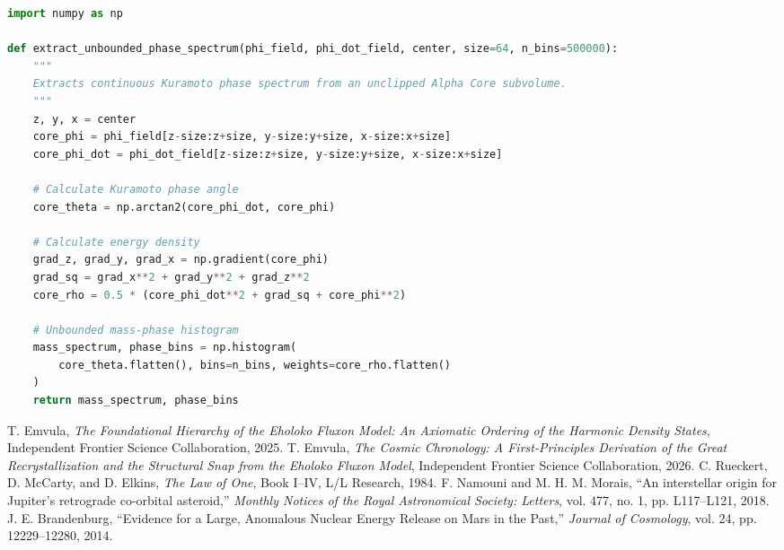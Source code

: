 \documentclass[11pt, twoside]{article}
\begin{document}
\begin{lstlisting}[language=Python, caption={Unbounded Fisher-Phase Spectroscopic Extraction Implementation.}]
import numpy as np

def extract_unbounded_phase_spectrum(phi_field, phi_dot_field, center, size=64, n_bins=500000):
    """
    Extracts continuous Kuramoto phase spectrum from an unclipped Alpha Core subvolume.
    """
    z, y, x = center
    core_phi = phi_field[z-size:z+size, y-size:y+size, x-size:x+size]
    core_phi_dot = phi_dot_field[z-size:z+size, y-size:y+size, x-size:x+size]
    
    # Calculate Kuramoto phase angle
    core_theta = np.arctan2(core_phi_dot, core_phi)
    
    # Calculate energy density
    grad_z, grad_y, grad_x = np.gradient(core_phi)
    grad_sq = grad_x**2 + grad_y**2 + grad_z**2
    core_rho = 0.5 * (core_phi_dot**2 + grad_sq + core_phi**2)
    
    # Unbounded mass-phase histogram
    mass_spectrum, phase_bins = np.histogram(
        core_theta.flatten(), bins=n_bins, weights=core_rho.flatten()
    )
    return mass_spectrum, phase_bins
\end{lstlisting}


\begin{thebibliography}{99}
 T. Emvula, \textit{The Foundational Hierarchy of the Eholoko Fluxon Model: An Axiomatic Ordering of the Harmonic Density States}, Independent Frontier Science Collaboration, 2025.
 T. Emvula, \textit{The Cosmic Chronology: A First-Principles Derivation of the Great Recrystallization and the Structural Snap from the Eholoko Fluxon Model}, Independent Frontier Science Collaboration, 2026.
 C. Rueckert, D. McCarty, and D. Elkins, \textit{The Law of One}, Book I--IV, L/L Research, 1984.
 F. Namouni and M. H. M. Morais, ``An interstellar origin for Jupiter's retrograde co-orbital asteroid,'' \textit{Monthly Notices of the Royal Astronomical Society: Letters}, vol. 477, no. 1, pp. L117--L121, 2018.
 J. E. Brandenburg, ``Evidence for a Large, Anomalous Nuclear Energy Release on Mars in the Past,'' \textit{Journal of Cosmology}, vol. 24, pp. 12229--12280, 2014.
\end{thebibliography}
\end{document}
